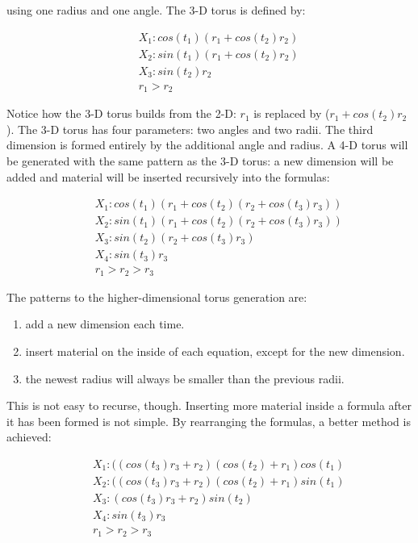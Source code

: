 \documentclass[article]{jss}
\begin{document}
\noindent using one radius and one angle. The 3-D torus is defined by:

\begin{eqnarray*}
&&X_1: cos(t_1)(r_1 + cos(t_2)r_2)\\
&&X_2: sin(t_1)(r_1 + cos(t_2)r_2)\\
&&X_3: sin(t_2)r_2\\
&&r_1>r_2
\end{eqnarray*}

Notice how the 3-D torus builds from the 2-D: $r_1$ is replaced by
($r_1+cos(t_2)r_2$). The 3-D torus has four parameters: two angles and
two radii. The third dimension is formed entirely by the additional
angle and radius.  A 4-D torus will be generated with the same pattern
as the 3-D torus: a new dimension will be added and material will be
inserted recursively into the formulas:

\begin{eqnarray*}
&&X_1: cos(t_1)(r_1 + cos(t_2)(r_2 + cos(t_3)r_3))\\
&&X_2: sin(t_1)(r_1 + cos(t_2)(r_2 + cos(t_3)r_3))\\
&&X_3: sin(t_2)(r_2 + cos(t_3)r_3)\\
&&X_4: sin(t_3)r_3\\
&&r_1>r_2>r_3
\end{eqnarray*}

The patterns to the higher-dimensional torus generation are:

\begin{enumerate} \itemsep 0in
\item add a new dimension each time.
\item insert material on the inside of each equation, except for the
  new dimension.
\item the newest radius will always be smaller than the previous radii.
\end{enumerate}

This is not easy to recurse, though. Inserting more material inside a
formula after it has been formed is not simple. By rearranging the
formulas, a better method is achieved:

\begin{eqnarray*}
&&X_1: ((cos(t_3)r_3 + r_2)(cos(t_2) + r_1)cos(t_1)\\
&&X_2: ((cos(t_3)r_3 + r_2)(cos(t_2) + r_1)sin(t_1)\\
&&X_3:  (cos(t_3)r_3 + r_2) sin(t_2)\\
&&X_4:   sin(t_3)r_3\\
&&r_1>r_2>r_3
\end{eqnarray*}
\end{document}
